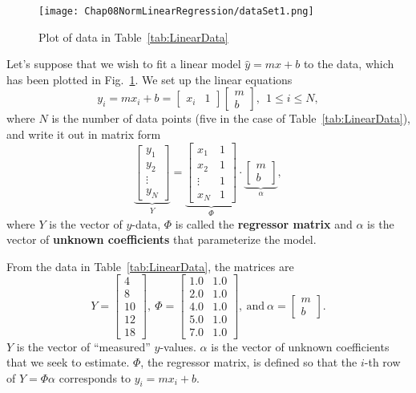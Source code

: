 \begin{figure}[!hbt]
        \centerline{\texttt{[image: Chap08NormLinearRegression/dataSet1.png]}}
        \caption{Plot of data in Table~\ref{tab:LinearData}}
        \label{fig:PlotLinearData}
\end{figure}
Let's suppose that we wish to fit a linear model  $\hat{y}=mx+b$ to the data, which has been plotted in Fig.~\ref{fig:PlotLinearData}. We set up the linear equations
$$y_i = m x_i +b = \begin{bmatrix} x_i & 1 \end{bmatrix} \begin{bmatrix} m \\ b \end{bmatrix},  ~~1 \le i \le N,$$ 
where $N$ is the number of data points (five in the case of Table~\ref{tab:LinearData}), and write it out in matrix form
\begin{equation}
    \label{eq:FirstRegressionModel02}
\underbrace{\begin{bmatrix} y_1 \\ y_2 \\ \vdots \\y_N \end{bmatrix}}_{Y} = \underbrace{\left[\begin{array}{cc}
    x_1 & 1 \\
    x_2  & 1 \\
    \vdots & 1 \\
    x_N & 1
\end{array}  \right]}_{\Phi} \cdot  \underbrace{\begin{bmatrix} m \\ b \end{bmatrix}}_{\alpha},
\end{equation}
where $Y$ is the vector of $y$-data, $\Phi$ is called the \textbf{regressor matrix} and $\alpha$ is the vector of \textbf{unknown coefficients} that parameterize the  model.

From the data in Table~\ref{tab:LinearData}, the matrices are
$$ Y= \left[\begin{array}{r}
4 \\  8 \\ 10 \\ 12 \\ 18 \end{array}\right], ~ \Phi=  \left[\begin{array}{rr}
 1.0 & 1.0 \\
 2.0 & 1.0 \\
 4.0 & 1.0 \\
 5.0 & 1.0 \\
 7.0  & 1.0
 \end{array}\right], ~\text{and} ~ \alpha= \left[\begin{array}{r}
m\\
b
 \end{array}\right].$$
 $Y$ is the vector of ``measured'' $y$-values. $\alpha$ is the vector of unknown coefficients that we seek to estimate. $\Phi$,  the regressor matrix, is defined so that the $i$-th row of $Y=\Phi \alpha$ corresponds to $y_i=m x_i + b.$ \\
 
